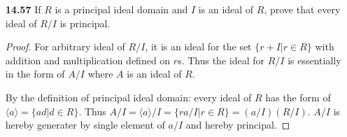 \documentclass[11pt, oneside]{article}
\newcommand{\R}{\mathbb R}
\newtheorem*{theorem}{Theorem}
\begin{document}
\begin{enumerate}
\begin{proof}
From this, we can use theorem 14.4 on Gallian:
\begin{theorem}
Let R be a commutative ring with unity and let A be an ideal of R, then R/A is a field if and only if A is maximal.
\end{theorem}

We can hereby conclude that $\R[x]/\langle x^2+1\rangle$ is a field.

\end{proof}

\newpage
\item[{\bf 14.57}]  If $R$ is a principal ideal domain and $I$ is an ideal of $R$, prove that every ideal of $R/I$ is principal.
\begin{proof}
For arbitrary ideal of $R/I$, it is an ideal for the set $\{r+I|r\in R\}$ with addition and multiplication defined on $r$s. Thus the ideal for $R/I$ is essentially in the form of $A/I$ where $A$ is an ideal of $R$.

By the definition of principal ideal domain: every ideal of $R$ has the form of $\langle a \rangle=\{ad|d\in R\}$. Thus $A/I=\langle a \rangle/I=\{ra/I|r\in R\}=(a/I)(R/I)$. $A/I$ is hereby generater by single element of $a/I$ and hereby principal.
\end{proof}
\end{enumerate}
\end{document}
